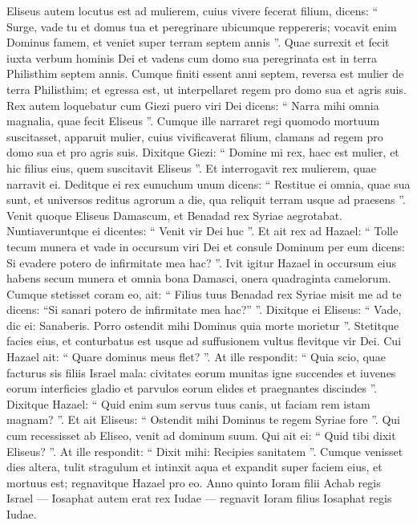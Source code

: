\begin{biblechapter}
\begin{biblechapter}
\begin{biblechapter}
\begin{biblechapter}
\begin{biblechapter}
\begin{biblechapter}
\begin{biblechapter}
\begin{biblechapter}
 \verse Eliseus autem locutus est ad mulierem, cuius vivere fecerat filium, dicens: “ Surge, vade tu et domus tua et peregrinare ubicumque reppereris; vocavit enim Dominus famem, et veniet super terram septem annis ”. 
\verse Quae surrexit et fecit iuxta verbum hominis Dei et vadens cum domo sua peregrinata est in terra Philisthim septem annis.
 \verse Cumque finiti essent anni septem, reversa est mulier de terra Philisthim; et egressa est, ut interpellaret regem pro domo sua et agris suis. 
\verse Rex autem loquebatur cum Giezi puero viri Dei dicens: “ Narra mihi omnia magnalia, quae fecit Eliseus ”. 
\verse Cumque ille narraret regi quomodo mortuum suscitasset, apparuit mulier, cuius vivificaverat filium, clamans ad regem pro domo sua et pro agris suis. Dixitque Giezi: “ Domine mi rex, haec est mulier, et hic filius eius, quem suscitavit Eliseus ”. 
\verse Et interrogavit rex mulierem, quae narravit ei. Deditque ei rex eunuchum unum dicens: “ Restitue ei omnia, quae sua sunt, et universos reditus agrorum a die, qua reliquit terram usque ad praesens ”.
 \verse Venit quoque Eliseus Damascum, et Benadad rex Syriae aegrotabat. Nuntiaveruntque ei dicentes: “ Venit vir Dei huc ”. 
\verse Et ait rex ad Hazael: “ Tolle tecum munera et vade in occursum viri Dei et consule Dominum per eum dicens: Si evadere potero de infirmitate mea hac? ”.
 \verse Ivit igitur Hazael in occursum eius habens secum munera et omnia bona Damasci, onera quadraginta camelorum. Cumque stetisset coram eo, ait: “ Filius tuus Benadad rex Syriae misit me ad te dicens: “Si sanari potero de infirmitate mea hac?” ”. 
\verse Dixitque ei Eliseus: “ Vade, dic ei: Sanaberis. Porro ostendit mihi Dominus quia morte morietur ”. 
\verse Stetitque facies eius, et conturbatus est usque ad suffusionem vultus flevitque vir Dei. 
\verse Cui Hazael ait: “ Quare dominus meus flet? ”. At ille respondit: “ Quia scio, quae facturus sis filiis Israel mala: civitates eorum munitas igne succendes et iuvenes eorum interficies gladio et parvulos eorum elides et praegnantes discindes ”. 
\verse Dixitque Hazael: “ Quid enim sum servus tuus canis, ut faciam rem istam magnam? ”. Et ait Eliseus: “ Ostendit mihi Dominus te regem Syriae fore ”.
 \verse Qui cum recessisset ab Eliseo, venit ad dominum suum. Qui ait ei: “ Quid tibi dixit Eliseus? ”. At ille respondit: “ Dixit mihi: Recipies sanitatem ”. 
\verse Cumque venisset dies altera, tulit stragulum et intinxit aqua et expandit super faciem eius, et mortuus est; regnavitque Hazael pro eo.
 \verse Anno quinto Ioram filii Achab regis Israel — Iosaphat autem erat rex Iudae — regnavit Ioram filius Iosaphat regis Iudae. 

\end{biblechapter}
\end{biblechapter}
\end{biblechapter}
\end{biblechapter}
\end{biblechapter}
\end{biblechapter}
\end{biblechapter}
\end{biblechapter}
